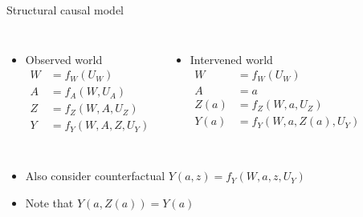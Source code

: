 \documentclass{beamer}
\begin{document}
\begin{frame}[noframenumbering]
  \thispagestyle{empty}
  \titlepage
\end{frame}


\begin{frame}{Structural causal model}
  \begin{columns}[c]
    \begin{itemize}
    \item Observed world
      \begin{align*}
        W&=f_W(U_W)\\
        A&=f_A(W, U_A)\\
        Z&=f_Z(W, A, U_Z)\\
        Y&=f_Y(W, A, Z, U_Y)
      \end{align*}
    \end{itemize}
    \begin{itemize}
    \item Intervened world
      \begin{align*}
        W&=f_W(U_W)\\
        A&=a\\
        Z(a)&=f_Z(W, a, U_Z)\\
        Y(a)&=f_Y(W, a, Z(a), U_Y)
      \end{align*}
    \end{itemize}
  \end{columns}

  \vspace{2mm}

  \begin{itemize}
    \item Also consider counterfactual $Y(a, z)=f_Y(W, a, z, U_Y)$
    \item Note that $Y(a, Z(a)) = Y(a)$
  \end{itemize}
  \begin{figure}[!htb]
    \centering
    \end{figure}

\note{
}

\end{frame}
\end{document}
